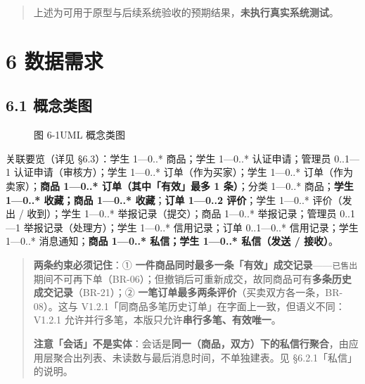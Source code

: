 \documentclass[12pt,a4paper]{ctexart}
\begin{document}
\begin{quote}\small
上述为可用于原型与后续系统验收的预期结果，\textbf{未执行真实系统测试}。

\end{quote}


\section*{6 数据需求}

\subsection*{6.1 概念类图}
\begin{figure}[htbp]
\centering
{}
\caption*{图 6-1\quad UML 概念类图}
\label{fig:class}
\end{figure}


关联要览（详见 §6.3）：学生 1—0..* 商品；学生 1—0..* 认证申请；管理员 0..1—1 认证申请（审核方）；学生 1—0..* 订单（作为买家）；学生 1—0..* 订单（作为卖家）；\textbf{商品 1—0..* 订单（其中「有效」最多 1 条）}；分类 1—0..* 商品；\textbf{学生 1—0..* 收藏；商品 1—0..* 收藏}；\textbf{订单 1—0..2 评价}；学生 1—0..* 评价（发出 / 收到）；学生 1—0..* 举报记录（提交）；商品 1—0..* 举报记录；管理员 0..1—1 举报记录（处理方）；学生 1—0..* 信用记录；订单 0..1—0..* 信用记录；学生 1—0..* 消息通知；\textbf{商品 1—0..* 私信；学生 1—0..* 私信（发送 / 接收）}。


\begin{quote}\small
\textbf{两条约束必须记住}：① \textbf{一件商品同时最多一条「有效」成交记录}——\texttt{已售出} 期间不可再下单（BR-06）；但撤销后可重新成交，故同商品可有\textbf{多条历史成交记录}（BR-21）；② \textbf{一笔订单最多两条评价}（买卖双方各一条，BR-08）。这与 V1.2.1「同商品多笔历史订单」在字面上一致，但语义不同：V1.2.1 允许并行多笔，本版只允许\textbf{串行多笔、有效唯一}。

\textbf{注意「会话」不是实体}：会话是\textbf{同一（商品，双方）下的私信行聚合}，由应用层聚合出列表、未读数与最后消息时间，不单独建表。见 §6.2.1「私信」的说明。

\end{quote}
\end{document}
